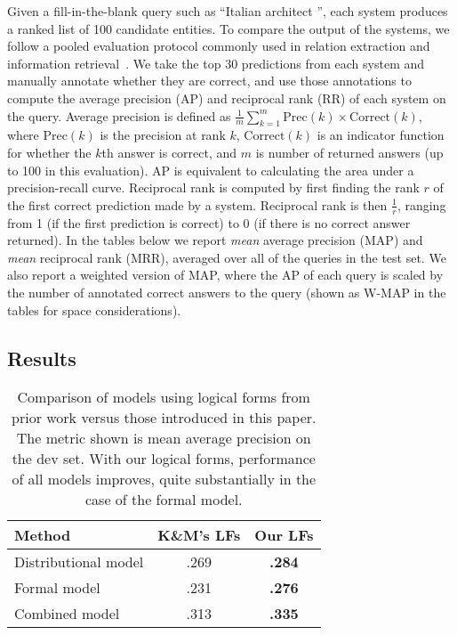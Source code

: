 \documentclass[11pt]{article}
\newcommand{\blank}{\underline{\hspace{.5cm}}}
\begin{document}
Given a fill-in-the-blank query such as ``Italian architect \blank{}'', each
system produces a ranked list of 100 candidate entities.  To compare the output
of the systems, we follow a pooled evaluation protocol commonly used in
relation extraction and information
retrieval~\cite{west-2014-kbc-via-qa,riedel-2013-mf-universal-schema}.  We take
the top 30 predictions from each system and manually annotate whether they are
correct, and use those annotations to compute the average precision (AP) and
reciprocal rank (RR) of each system on the query.  Average precision is defined
as $\frac{1}{m}\sum^m_{k=1} \mathrm{Prec}(k) \times \mathrm{Correct}(k)$, where
$\mathrm{Prec}(k)$ is the precision at rank $k$, $\mathrm{Correct}(k)$ is an
indicator function for whether the $k$th answer is correct, and $m$ is number
of returned answers (up to 100 in this evaluation).  AP is equivalent to
calculating the area under a precision-recall curve.  Reciprocal rank is
computed by first finding the rank $r$ of the first correct prediction made by
a system.  Reciprocal rank is then $\frac{1}{r}$, ranging from 1 (if the first
prediction is correct) to 0 (if there is no correct answer returned).  In the
tables below we report \emph{mean} average precision (MAP) and \emph{mean}
reciprocal rank (MRR), averaged over all of the queries in the test set.  We
also report a weighted version of MAP, where the AP of each query is scaled by
the number of annotated correct answers to the query (shown as W-MAP in the
tables for space considerations).

\subsection{Results}

\begin{table}
  \centering
  {\small
    \begin{tabular}{lcc}
      \toprule
      Method & K\&M's LFs & Our LFs \\
      \midrule
      Distributional model & .269 & \textbf{.284} \\
      \midrule
      Formal model & .231 & \textbf{.276} \\
      \midrule
      Combined model & .313 & \textbf{.335} \\
      \bottomrule
    \end{tabular}
  }
  \caption{Comparison of models using logical forms from prior work versus
  those introduced in this paper.  The metric shown is mean average precision
  on the dev set.  With our logical forms, performance of all models improves,
  quite substantially in the case of the formal model.}
  \label{tab:better-lfs}
\end{table}
\end{document}
